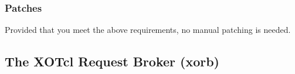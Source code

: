 	\subsubsection{Patches}
	Provided that you meet the above requirements, no manual patching is needed.
	\subsection{The XOTcl Request Broker (xorb)}
